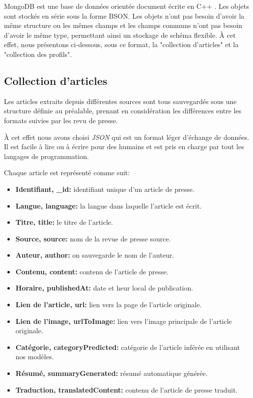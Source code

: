 MongoDB est une base de données orientée document écrite en C++ \cite{NOSQL3}. Les objets sont stockés en série sous la forme BSON.
Les objets n'ont pas besoin d'avoir la même structure ou les mêmes champs et les champs communs n'ont pas besoin d'avoir le même type, permettant ainsi un stockage de schéma flexible. À cet effet, nous présentons ci-dessous, sous ce format, la "collection d'articles" et la "collection des profils".

\subsection{Collection d'articles}
Les articles extraits depuis différentes sources sont tous sauvegardés sous une structure définie au préalable, prenant en considération les différences entre les formats suivies par les revu de presse. 

À cet effet nous avons choisi \emph{JSON} qui est un format léger d'échange de données. Il est facile à lire ou à écrire pour des humains\cite{json} et est pris en charge par tout les langages de programmation.

Chaque article est représenté comme suit:
\begin{itemize}
    \item \textbf{Identifiant, \textquotedbl \_id\textquotedbl: } identifiant unique d'un article de presse.
    \item \textbf{Langue, \textquotedbl language\textquotedbl:} la langue dans laquelle l'article est écrit.
    \item \textbf{Titre, \textquotedbl title\textquotedbl:} le titre de l'article.
    \item \textbf{Source, \textquotedbl source\textquotedbl:} nom de la revue de presse source.
    \item \textbf{Auteur, \textquotedbl author\textquotedbl:} on sauvegarde le nom de l'auteur.
    \item \textbf{Contenu, \textquotedbl content\textquotedbl:} contenu de l'article de presse.
    \item \textbf{Horaire, \textquotedbl publishedAt\textquotedbl:} date et heur local de publication.
    \item \textbf{Lien de l'article, \textquotedbl url\textquotedbl:} lien vers la page de l'article originale.
    \item \textbf{Lien de l'image, \textquotedbl urlToImage\textquotedbl:} lien vers l'image principale de l'article originale.
    \item \textbf{Catégorie, \textquotedbl categoryPredicted\textquotedbl:} catégorie de l'article inférée en utilisant nos modèles.
    \item \textbf{Résumé, \textquotedbl summaryGenerated\textquotedbl:} résumé automatique générée.
    \item \textbf{Traduction, \textquotedbl translatedContent\textquotedbl:} contenu de l'article de presse traduit.\\
\end{itemize}

